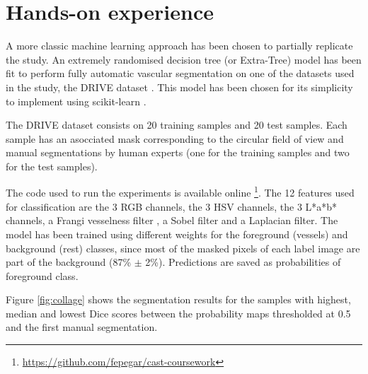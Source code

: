 \section{Hands-on experience}


A more classic machine learning approach has been chosen to partially replicate the study. An extremely randomised decision tree (or Extra-Tree) \cite{geurts_extremely_2006} model has been fit to perform fully automatic vascular segmentation on one of the datasets used in the study, the DRIVE dataset \cite{staal_ridge-based_2004}. This model has been chosen for its simplicity to implement using scikit-learn \cite{pedregosa_scikit-learn:_2011}.


The DRIVE dataset consists on 20 training samples and 20 test samples. Each sample has an asocciated mask corresponding to the circular field of view and manual segmentations by human experts (one for the training samples and two for the test samples).

The code used to run the experiments is available online \footnote{\href{https://github.com/fepegar/cast-coursework}{https://github.com/fepegar/cast-coursework}}. The 12 features used for classification are the 3 RGB channels, the 3 HSV channels, the 3 L*a*b* channels, a Frangi vesselness filter \cite{frangi_multiscale_1998}, a Sobel filter and a Laplacian filter. The model has been trained using different weights for the foreground (vessels) and background (rest) classes, since most of the masked pixels of each label image are part of the background (87\% $\pm$ 2\%). Predictions are saved as probabilities of foreground class.


Figure \ref{fig:collage} shows the segmentation results for the samples with highest, median and lowest Dice scores between the probability maps thresholded at 0.5 and the first manual segmentation.


